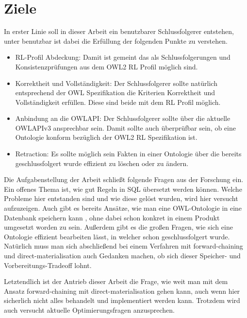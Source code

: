 \section{Ziele}
\label{abschnitt-ziele}

In erster Linie soll in dieser Arbeit ein benutzbarer Schlussfolgerer entstehen, unter benutzbar ist dabei die Erfüllung der folgenden Punkte zu verstehen.

\begin{itemize}
  \item RL-Profil Abdeckung: Damit ist gemeint das als Schlussfolgerungen und Konsistenzprüfungen aus dem OWL2 RL Profil möglich sind.
  \item Korrektheit und Vollständigkeit: Der Schlussfolgerer sollte natürlich entsprechend der OWL Spezifikation die Kriterien Korrektheit und Vollständigkeit erfüllen. Diese sind beide mit dem RL Profil möglich.
  \item Anbindung an die OWLAPI: Der Schlussfolgerer sollte über die aktuelle OWLAPIv3 ansprechbar sein. Damit sollte auch überprüfbar sein, ob eine Ontologie konform bezüglich der OWL2 RL Spezifikation ist.
  \item Retraction: Es sollte möglich sein Fakten in einer Ontologie über die bereits geschlussfolgert wurde effizient zu löschen oder zu ändern.
\end{itemize}

Die Aufgabenstellung der Arbeit schließt folgende Fragen aus der Forschung ein. Ein offenes Thema ist, wie gut Regeln in SQL übersetzt werden können. Welche Probleme hier entstanden sind und wie diese gelöst wurden, wird hier versucht aufzuzeigen. Auch gibt es bereits Ansätze, wie man eine OWL-Ontologie in eine Datenbank speichern kann \cite{Kleb2009OWLDB}, ohne dabei schon konkret in einem Produkt umgesetzt worden zu sein. Außerdem gibt es die großen Fragen, wie sich eine Ontologie effizient bearbeiten lässt, in welcher schon geschlussfolgert wurde. Natürlich muss man sich abschließend bei einem Verfahren mit forward-chaining und direct-materialisation auch Gedanken machen, ob sich dieser Speicher- und Vorbereitungs-Tradeoff lohnt.

Letztendlich ist der Antrieb dieser Arbeit die Frage, wie weit man mit dem Ansatz forward-chaining mit direct-materialisation gehen kann, auch wenn hier sicherlich nicht alles behandelt und implementiert werden kann. Trotzdem wird auch versucht aktuelle Optimierungsfragen anzusprechen.

